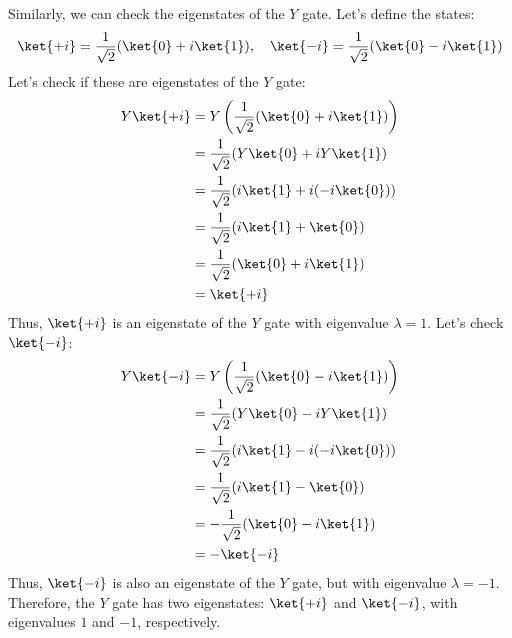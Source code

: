 \highspace
\solution Similarly, we can check the eigenstates of the $Y$ gate. Let's define the states:
\begin{equation*}
    \ket{+i} = \frac{1}{\sqrt{2}}(\ket{0} + i\ket{1}), \quad \ket{-i} = \frac{1}{\sqrt{2}}(\ket{0} - i\ket{1})
\end{equation*}
Let's check if these are eigenstates of the $Y$ gate:
\begin{equation*}
    \begin{aligned}
        Y\ket{+i} &= Y\left(\frac{1}{\sqrt{2}}(\ket{0} + i\ket{1})\right) \\
        &= \frac{1}{\sqrt{2}}(Y\ket{0} + iY\ket{1}) \\
        &= \frac{1}{\sqrt{2}}(i\ket{1} + i(-i\ket{0})) \\
        &= \frac{1}{\sqrt{2}}(i\ket{1} + \ket{0}) \\
        &= \frac{1}{\sqrt{2}}(\ket{0} + i\ket{1}) \\
        &= \ket{+i}
    \end{aligned}
\end{equation*}
Thus, $\ket{+i}$ is an eigenstate of the $Y$ gate with eigenvalue $\lambda = 1$. Let's check $\ket{-i}$:
\begin{equation*}
    \begin{aligned}
        Y\ket{-i} &= Y\left(\frac{1}{\sqrt{2}}(\ket{0} - i\ket{1})\right) \\
        &= \frac{1}{\sqrt{2}}(Y\ket{0} - iY\ket{1}) \\
        &= \frac{1}{\sqrt{2}}(i\ket{1} - i(-i\ket{0})) \\
        &= \frac{1}{\sqrt{2}}(i\ket{1} - \ket{0}) \\
        &= -\frac{1}{\sqrt{2}}(\ket{0} - i\ket{1}) \\
        &= -\ket{-i}
    \end{aligned}
\end{equation*}
Thus, $\ket{-i}$ is also an eigenstate of the $Y$ gate, but with eigenvalue $\lambda = -1$. Therefore, the $Y$ gate has two eigenstates: $\ket{+i}$ and $\ket{-i}$, with eigenvalues $1$ and $-1$, respectively.